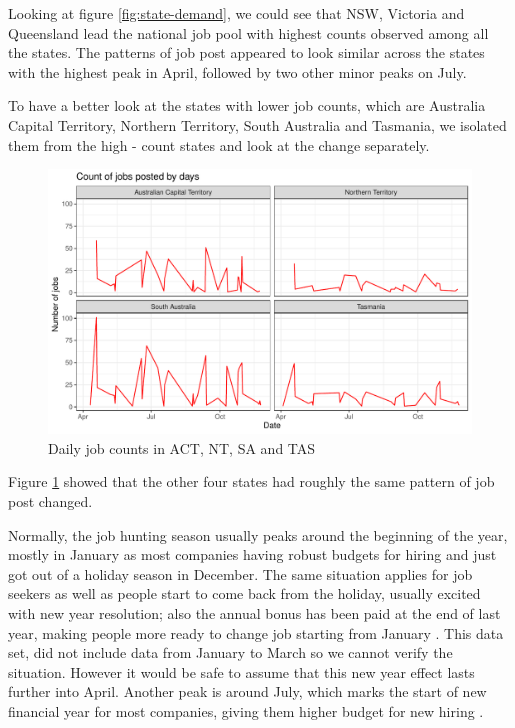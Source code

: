 \documentclass[11pt,a4paper,]{article}
\begin{document}
Looking at figure \ref{fig:state-demand}, we could see that NSW, Victoria and Queensland lead the national job pool with highest counts observed among all the states. The patterns of job post appeared to look similar across the states with the highest peak in April, followed by two other minor peaks on July.

To have a better look at the states with lower job counts, which are Australia Capital Territory, Northern Territory, South Australia and Tasmania, we isolated them from the high - count states and look at the change separately.

\begin{figure}
\centering
\includegraphics{Team_JHDP_Assignment4_files/figure-latex/low-demand-state-1.pdf}
\caption{\label{fig:low-demand-state}Daily job counts in ACT, NT, SA and TAS}
\end{figure}

Figure \ref{fig:low-demand-state} showed that the other four states had roughly the same pattern of job post changed.

Normally, the job hunting season usually peaks around the beginning of the year, mostly in January as most companies having robust budgets for hiring and just got out of a holiday season in December. The same situation applies for job seekers as well as people start to come back from the holiday, usually excited with new year resolution; also the annual bonus has been paid at the end of last year, making people more ready to change job starting from January \textcite{emswiler_2016}. This data set, did not include data from January to March so we cannot verify the situation. However it would be safe to assume that this new year effect lasts further into April. Another peak is around July, which marks the start of new financial year for most companies, giving them higher budget for new hiring \textcite{emswiler_2016}.
\end{document}
